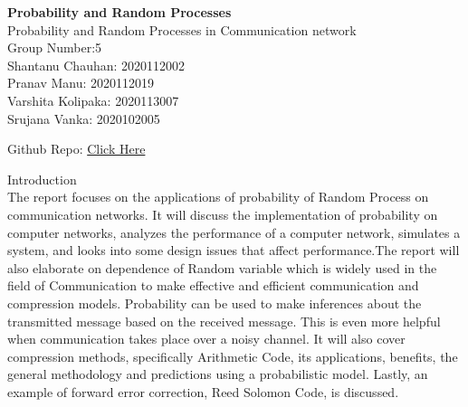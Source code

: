 \documentclass[10pt,twocolumn,letterpaper]{article}
\begin{document}
\begin{titlepage}
\centering

{\Huge \bfseries Probability and Random Processes\\}
\vspace{3cm}
{\huge Probability and Random Processes in Communication network\\}
\vspace{4cm}
{\huge Group Number:5\\}
\vspace{4cm}
{\large 
Shantanu Chauhan: 2020112002\\
Pranav Manu: 2020112019\\
Varshita Kolipaka: 2020113007\\
Srujana Vanka: 2020102005\\}

\vspace{2cm}
Github Repo: \href{https://github.com/hohilwik/PRP-project}{Click Here}
\end{titlepage}





\begin{onecolumn}

{\Huge \centering Introduction\\}
\vspace{0.5cm}
\large
The report focuses on the applications of probability of Random Process on communication networks. It will discuss the implementation of probability on computer networks, analyzes the performance of a computer network, simulates a system, and looks into some design issues that affect performance.The report will also elaborate on dependence of Random variable which is widely used in the field of Communication to make effective and efficient communication and compression models. Probability can be used to make inferences about the transmitted message based on the received message. This is even more helpful when communication takes place over a noisy channel. It will also cover compression methods, specifically Arithmetic Code, its applications, benefits, the general methodology and predictions using a probabilistic model. Lastly, an example of forward error correction, Reed Solomon Code, is discussed.
\end{onecolumn}
\newpage
\twocolumn
\end{document}
